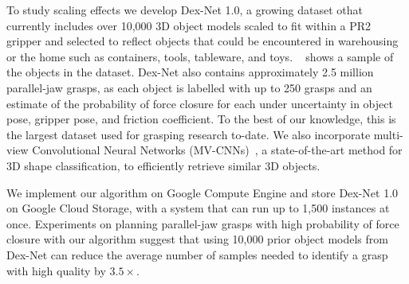 To study scaling effects we develop Dex-Net 1.0, a growing dataset othat currently includes over 10,000 3D object models scaled to fit within a PR2 gripper and selected to reflect objects that could be encountered in warehousing or the home such as containers, tools, tableware, and toys.
~ shows a sample of the objects in the dataset.
Dex-Net also contains approximately 2.5 million parallel-jaw grasps, as each object is labelled with up to 250 grasps and an estimate of the probability of force closure for each under uncertainty in object pose, gripper pose, and friction coefficient.
To the best of our knowledge, this is the largest dataset used for grasping research to-date.
We also incorporate multi-view Convolutional Neural Networks (MV-CNNs)~\cite{su2015multi}, a state-of-the-art method for 3D shape classification, to efficiently retrieve similar 3D objects. 

We implement our algorithm on Google Compute Engine and store Dex-Net 1.0 on Google Cloud Storage, with a system that can run up to 1,500 instances at once.
Experiments on planning parallel-jaw grasps with high probability of force closure with our algorithm suggest that using 10,000 prior object models from Dex-Net can reduce the average number of samples needed to identify a grasp with high quality by $3.5\times$.

 





